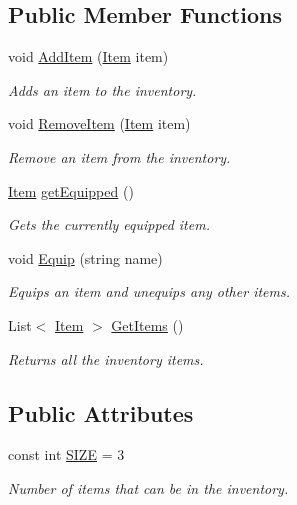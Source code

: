 \subsection*{Public Member Functions}
\begin{DoxyCompactItemize}
\item 
void \mbox{\hyperlink{class_inventory_ae303988e27a0af99552f8d3c954df0c2}{Add\+Item}} (\mbox{\hyperlink{class_item}{Item}} item)
\begin{DoxyCompactList}\small\item\em Adds an item to the inventory. \end{DoxyCompactList}\item 
void \mbox{\hyperlink{class_inventory_a9ac6471939fdbe154c35eed678c6976b}{Remove\+Item}} (\mbox{\hyperlink{class_item}{Item}} item)
\begin{DoxyCompactList}\small\item\em Remove an item from the inventory. \end{DoxyCompactList}\item 
\mbox{\hyperlink{class_item}{Item}} \mbox{\hyperlink{class_inventory_adc1befc890a2f08843b92ca78ef02758}{get\+Equipped}} ()
\begin{DoxyCompactList}\small\item\em Gets the currently equipped item. \end{DoxyCompactList}\item 
void \mbox{\hyperlink{class_inventory_a951725050ee3ffb094ba575a0ccdd566}{Equip}} (string name)
\begin{DoxyCompactList}\small\item\em Equips an item and unequips any other items. \end{DoxyCompactList}\item 
List$<$ \mbox{\hyperlink{class_item}{Item}} $>$ \mbox{\hyperlink{class_inventory_a8b355dd7bd1fab5ca34729f1530db9ee}{Get\+Items}} ()
\begin{DoxyCompactList}\small\item\em Returns all the inventory items. \end{DoxyCompactList}\end{DoxyCompactItemize}
\subsection*{Public Attributes}
\begin{DoxyCompactItemize}
\item 
const int \mbox{\hyperlink{class_inventory_aff412f987227c8b93c3165ba7dbdf9bc}{S\+I\+ZE}} = 3
\begin{DoxyCompactList}\small\item\em Number of items that can be in the inventory. \end{DoxyCompactList}\end{DoxyCompactItemize}
